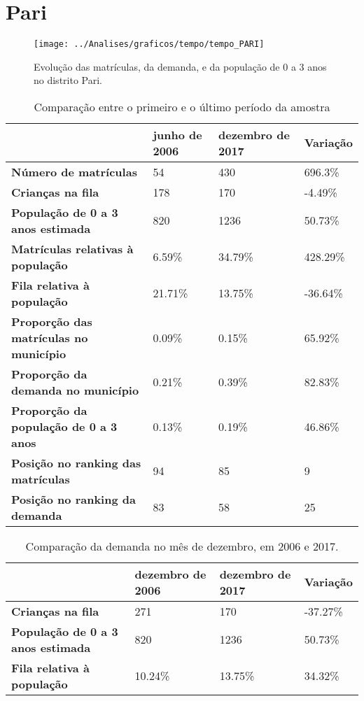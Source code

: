 \section{Pari}
\begin{figure}[H]
\centering
\texttt{[image: ../Analises/graficos/tempo/tempo\_PARI]}
\caption{Evolução das matrículas, da demanda, e da população de 0 a 3 anos no distrito Pari.}
\end{figure}
\begin{table}[H]
\begin{tabular}{|l|l|l|l|}
\hline
\textbf{}                                      & \textbf{junho de 2006}       & \textbf{dezembro de 2017}    & \textbf{Variação} \\ \hline
\textbf{Número de matrículas}                  & 54 & 430 & 696.3\% \\ \hline
\textbf{Crianças na fila}                      & 178 & 170 & -4.49\% \\ \hline
\textbf{População de 0 a 3 anos estimada}      & 820 & 1236 & 50.73\% \\ \hline
\textbf{Matrículas relativas à população}      & 6.59\% & 34.79\% & 428.29\% \\ \hline
\textbf{Fila relativa à população}             & 21.71\% & 13.75\% & -36.64\% \\ \hline
\textbf{Proporção das matrículas no município} & 0.09\% & 0.15\% & 65.92\% \\ \hline
\textbf{Proporção da demanda no município}     & 0.21\% & 0.39\% & 82.83\% \\ \hline
\textbf{Proporção da população de 0 a 3 anos}  & 0.13\% & 0.19\% & 46.86\% \\ \hline
\textbf{Posição no ranking das matrículas}     & 94 & 85 & 9 \\ \hline
\textbf{Posição no ranking da demanda}         & 83 & 58 & 25 \\ \hline
\end{tabular}
\caption{Comparação entre o primeiro e o último período da amostra}
\end{table}
\begin{table}[H]
\begin{tabular}{|l|l|l|l|}
\hline
\textbf{}                                 & \textbf{dezembro de 2006} & \textbf{dezembro de 2017} & \textbf{Variação} \\ \hline
\textbf{Crianças na fila}                      & 271 & 170 & -37.27\% \\ \hline
\textbf{População de 0 a 3 anos estimada}      & 820 & 1236 & 50.73\% \\ \hline
\textbf{Fila relativa à população}             & 10.24\% & 13.75\% & 34.32\% \\ \hline
\end{tabular}
\caption{Comparação da demanda no mês de dezembro, em 2006 e 2017.}
\end{table}
